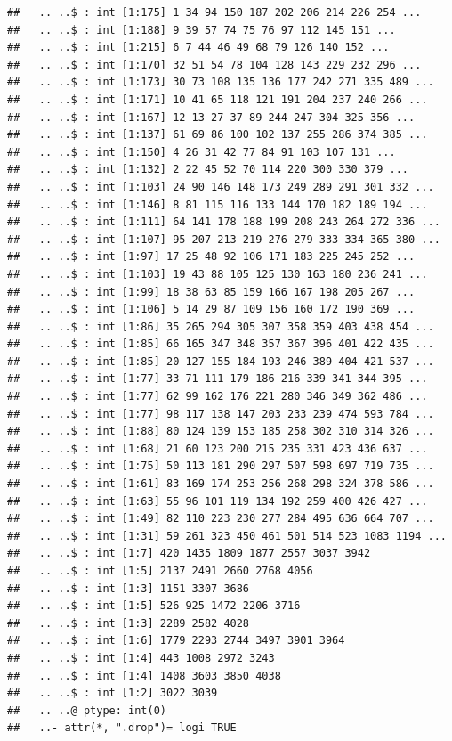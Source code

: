 \documentclass[
]{article}
\begin{document}
\begin{verbatim}
##   .. ..$ : int [1:175] 1 34 94 150 187 202 206 214 226 254 ...
##   .. ..$ : int [1:188] 9 39 57 74 75 76 97 112 145 151 ...
##   .. ..$ : int [1:215] 6 7 44 46 49 68 79 126 140 152 ...
##   .. ..$ : int [1:170] 32 51 54 78 104 128 143 229 232 296 ...
##   .. ..$ : int [1:173] 30 73 108 135 136 177 242 271 335 489 ...
##   .. ..$ : int [1:171] 10 41 65 118 121 191 204 237 240 266 ...
##   .. ..$ : int [1:167] 12 13 27 37 89 244 247 304 325 356 ...
##   .. ..$ : int [1:137] 61 69 86 100 102 137 255 286 374 385 ...
##   .. ..$ : int [1:150] 4 26 31 42 77 84 91 103 107 131 ...
##   .. ..$ : int [1:132] 2 22 45 52 70 114 220 300 330 379 ...
##   .. ..$ : int [1:103] 24 90 146 148 173 249 289 291 301 332 ...
##   .. ..$ : int [1:146] 8 81 115 116 133 144 170 182 189 194 ...
##   .. ..$ : int [1:111] 64 141 178 188 199 208 243 264 272 336 ...
##   .. ..$ : int [1:107] 95 207 213 219 276 279 333 334 365 380 ...
##   .. ..$ : int [1:97] 17 25 48 92 106 171 183 225 245 252 ...
##   .. ..$ : int [1:103] 19 43 88 105 125 130 163 180 236 241 ...
##   .. ..$ : int [1:99] 18 38 63 85 159 166 167 198 205 267 ...
##   .. ..$ : int [1:106] 5 14 29 87 109 156 160 172 190 369 ...
##   .. ..$ : int [1:86] 35 265 294 305 307 358 359 403 438 454 ...
##   .. ..$ : int [1:85] 66 165 347 348 357 367 396 401 422 435 ...
##   .. ..$ : int [1:85] 20 127 155 184 193 246 389 404 421 537 ...
##   .. ..$ : int [1:77] 33 71 111 179 186 216 339 341 344 395 ...
##   .. ..$ : int [1:77] 62 99 162 176 221 280 346 349 362 486 ...
##   .. ..$ : int [1:77] 98 117 138 147 203 233 239 474 593 784 ...
##   .. ..$ : int [1:88] 80 124 139 153 185 258 302 310 314 326 ...
##   .. ..$ : int [1:68] 21 60 123 200 215 235 331 423 436 637 ...
##   .. ..$ : int [1:75] 50 113 181 290 297 507 598 697 719 735 ...
##   .. ..$ : int [1:61] 83 169 174 253 256 268 298 324 378 586 ...
##   .. ..$ : int [1:63] 55 96 101 119 134 192 259 400 426 427 ...
##   .. ..$ : int [1:49] 82 110 223 230 277 284 495 636 664 707 ...
##   .. ..$ : int [1:31] 59 261 323 450 461 501 514 523 1083 1194 ...
##   .. ..$ : int [1:7] 420 1435 1809 1877 2557 3037 3942
##   .. ..$ : int [1:5] 2137 2491 2660 2768 4056
##   .. ..$ : int [1:3] 1151 3307 3686
##   .. ..$ : int [1:5] 526 925 1472 2206 3716
##   .. ..$ : int [1:3] 2289 2582 4028
##   .. ..$ : int [1:6] 1779 2293 2744 3497 3901 3964
##   .. ..$ : int [1:4] 443 1008 2972 3243
##   .. ..$ : int [1:4] 1408 3603 3850 4038
##   .. ..$ : int [1:2] 3022 3039
##   .. ..@ ptype: int(0) 
##   ..- attr(*, ".drop")= logi TRUE
\end{verbatim}
\end{document}
